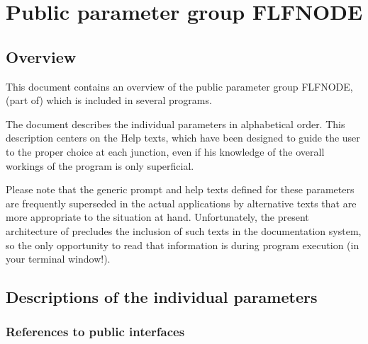 
\chapter{ Public parameter group FLFNODE}
\tableofcontents


\section{ Overview}

	This document contains an overview of the public parameter group
FLFNODE, (part of) which is included in several \NEWSTAR programs.



	The
document describes the individual parameters in alphabetical order. This
description centers on the Help texts, which have been designed to guide the
user to the proper choice at each junction, even if his knowledge of the
overall workings of the program is only superficial.

	Please note that the generic prompt and help texts defined for these
parameters are frequently superseded in the actual applications by alternative
texts that are more appropriate to the situation at hand. Unfortunately, the
present architecture of \NEWSTAR precludes the inclusion of such texts in the
documentation system, so the only opportunity to read that information is
during program execution (in your terminal window!).


\section{ Descriptions of the individual parameters}
\label{.descriptions}

\subsection{ References to public interfaces}
\label{.public}

